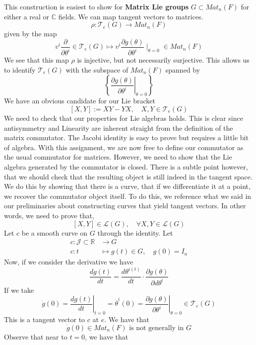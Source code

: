 This construction is easiest to show for \textbf{Matrix Lie groups} $ G \subset Mat_n ( F) $ for either a real or $\mathbb{C} $ fields. We can 
map tangent vectors to matrices. 
\[
	\rho : \mathcal{ T}_{ e }( G ) \to Mat_n ( F)
\] given by the map 
\[
v^{ i }\frac{\partial }{\partial \theta^{ i  } } \in \mathcal{ T }_e ( G ) \mapsto v^{ i } \frac{\partial  g ( \theta ) }{\partial \theta^{ i }} \mid_{ \theta = 0 } \in Mat_n ( F)  
\] We see that this map $\rho $ is injective, but not necessarily 
surjective. 
This allows us to identify $ \mathcal{ T }_{ e }( G ) $ with 
the subspace of $ Mat_n ( F ) $ spanned by 
\[
\left\{ \left. \frac{\partial  g ( \theta ) }{\partial \theta^{ i } } \right \vert_{ \theta = 0 }   \right\} 
\] We have an obvious candidate for our Lie bracket 
\[
[ X, Y ] := XY - Y X, \quad X, Y \in \mathcal{ T }_e ( G ) 
\] We need to check that our properties for Lie 
algebras holds. This is clear since antisymmetry and Linearity are inherent 
straight from the definition of the matrix commutator. 
The Jacobi identity is easy to prove but requires a little bit of algebra. 
With this assignment, we are now free to define our commutator as the usual commutator for matrices. 
However, we need to show that the Lie algebra generated by the commutator is closed. 
There is a subtle point however, that we should check that the resulting object is still indeed in the tangent space. We do this by showing that there is a curve, that if we differentiate it at a point, we recover the commutator object itself. To do this, we reference what we said in our preliminaries about constructing curves that yield tangent vectors. 
In other words, we need to prove that, 
\[
[ X, Y ] \in \mathcal{ L } ( G ), \quad \forall X, Y \in \mathcal{ L }( G ) 
\] Let $ c $ be a smooth curve on $ G $ through the 
identity. Let 
\begin{align*}
	c : \mathcal{ J } \subset \mathbb{ R}  & \to G \\
	c : t  & \mapsto g ( t) \in G , \quad g ( 0 )  = I_n 
\end{align*} Now, if we consider 
the derivative we have 
\[
	\frac{ d g ( t) }{ dt } = \frac{ d \theta ^{ i ( t ) }}{d t } \cdot \frac{\partial  g ( \theta ) }{\partial d \theta^{ i }} 
\] If we take 
\[
\dot{ g } ( 0 )  = \left. \frac{ d g( t) }{ dt } \right \vert_{ t =0 } = \dot{ \theta}^{ i }( 0 )  = \left. \frac{\partial g ( \theta ) }{\partial \theta^{i }} \right \vert_{ \theta  =0 } \in \mathcal{ T }_e ( G )
\] This is a tangent vector to $c $ at $ e $. 
We have that 
\[
\dot{ g} ( 0 ) \in Mat_n ( F) \text{ is not generally in } G 
\] Observe that near to $ t  = 0 $, we have that 
